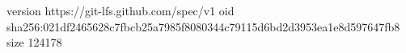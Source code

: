 version https://git-lfs.github.com/spec/v1
oid sha256:021df2465628c7fbcb25a7985f8080344c79115d6bd2d3953ea1e8d597647fb8
size 124178
